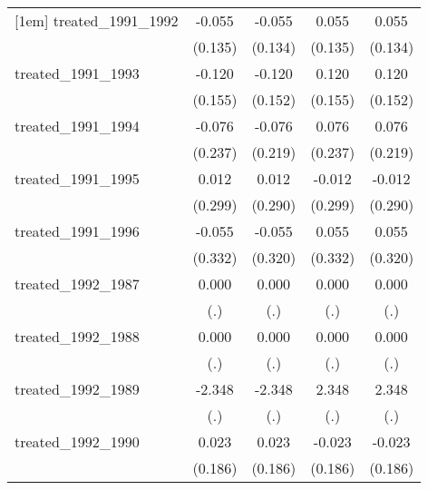 {\begin{tabular}{l*{4}{c}}
[1em]
treated\_1991\_1992&      -0.055         &      -0.055         &       0.055         &       0.055         \\
            &     (0.135)         &     (0.134)         &     (0.135)         &     (0.134)         \\
[1em]
treated\_1991\_1993&      -0.120         &      -0.120         &       0.120         &       0.120         \\
            &     (0.155)         &     (0.152)         &     (0.155)         &     (0.152)         \\
[1em]
treated\_1991\_1994&      -0.076         &      -0.076         &       0.076         &       0.076         \\
            &     (0.237)         &     (0.219)         &     (0.237)         &     (0.219)         \\
[1em]
treated\_1991\_1995&       0.012         &       0.012         &      -0.012         &      -0.012         \\
            &     (0.299)         &     (0.290)         &     (0.299)         &     (0.290)         \\
[1em]
treated\_1991\_1996&      -0.055         &      -0.055         &       0.055         &       0.055         \\
            &     (0.332)         &     (0.320)         &     (0.332)         &     (0.320)         \\
[1em]
treated\_1992\_1987&       0.000         &       0.000         &       0.000         &       0.000         \\
            &         (.)         &         (.)         &         (.)         &         (.)         \\
[1em]
treated\_1992\_1988&       0.000         &       0.000         &       0.000         &       0.000         \\
            &         (.)         &         (.)         &         (.)         &         (.)         \\
[1em]
treated\_1992\_1989&      -2.348         &      -2.348         &       2.348         &       2.348         \\
            &         (.)         &         (.)         &         (.)         &         (.)         \\
[1em]
treated\_1992\_1990&       0.023         &       0.023         &      -0.023         &      -0.023         \\
            &     (0.186)         &     (0.186)         &     (0.186)         &     (0.186)         \\

\end{tabular}}
